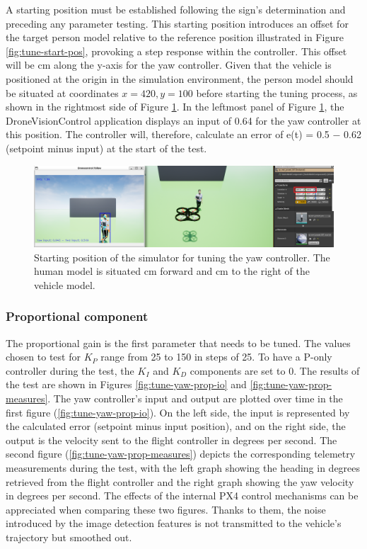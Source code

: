 A starting position must be established following the sign's determination and preceding any parameter testing. This starting position introduces an offset for the target person model relative to the reference position illustrated in Figure \ref{fig:tune-start-pos}, provoking a step response within the controller. This offset will be \unit[100]{cm} along the y-axis for the yaw controller. Given that the vehicle is positioned at the origin in the simulation environment, the person model should be situated at coordinates $x=420, y=100$ before starting the tuning process, as shown in the rightmost side of Figure \ref{fig:tune-ref-pos-yaw}. In the leftmost panel of Figure \ref{fig:tune-ref-pos-yaw}, the DroneVisionControl application displays an input of 0.64 for the yaw controller at this position. The controller will, therefore, calculate an error of e(t) = 0.5 − 0.62 (setpoint minus
input) at the start of the test.

\begin{figure}[H]
  \centering
  \includegraphics[width=\textwidth, keepaspectratio]{img/pid-3/tune-ref-pos-yaw.png}
  \caption{Starting position of the simulator for tuning the yaw controller. The human model is situated \unit[420]{cm} forward and \unit[100]{cm} to the right of the vehicle model.}
  \label{fig:tune-ref-pos-yaw}
\end{figure}

\subsubsection{Proportional component}

The proportional gain is the first parameter that needs to be tuned. The values chosen to test for $K_P$ range from 25 to 150 in steps of 25. To have a P-only controller during the test, the $K_I$ and $K_D$ components are set to 0. The results of the test are shown in Figures \ref{fig:tune-yaw-prop-io} and \ref{fig:tune-yaw-prop-measures}. The yaw controller's input and output are plotted over time in the first figure (\ref{fig:tune-yaw-prop-io}). On the left side, the input is represented by the calculated error (setpoint minus input position), and on the right side, the output is the velocity sent to the flight controller in degrees per second. The second figure (\ref{fig:tune-yaw-prop-measures}) depicts the corresponding telemetry measurements during the test, with the left graph showing the heading in degrees retrieved from the flight controller and the right graph showing the yaw velocity in degrees per second. The effects of the internal PX4 control mechanisms can be appreciated when comparing these two figures. Thanks to them, the noise introduced by the image detection features is not transmitted to the vehicle's trajectory but smoothed out.

